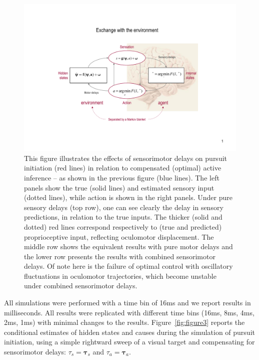 \documentclass[a4paper]{article} %
\begin{document}
\begin{figure}%
 \centerline{%
 \includegraphics[width=.95\columnwidth, clip, trim = 7.cm .5cm 6.1cm .4cm, page=4]{Figures_slides.pdf} %
}%
\caption{This figure illustrates the effects of sensorimotor
delays on pursuit initiation (red lines) in relation to compensated
(optimal) active inference -- as shown in the previous figure (blue
lines). The left panels show the true (solid lines) and estimated
sensory input (dotted lines), while action is shown in the right panels.
Under pure sensory delays (top row), one can see clearly the delay in
sensory predictions, in relation to the true inputs. The thicker (solid
and dotted) red lines correspond respectively to (true and predicted)
proprioceptive input, reflecting oculomotor displacement. The middle row
shows the equivalent results with pure motor delays and the lower row
presents the results with combined sensorimotor delays. Of note here is
the failure of optimal control with oscillatory fluctuations in
oculomotor trajectories, which become unstable under combined
sensorimotor delays.}%
\label{fig:figure4}
\end{figure}
All simulations were performed with a time bin of 16ms and we report results in milliseconds. All results were replicated with different time bins (16ms, 8ms, 4ms, 2ms, 1ms) with minimal changes to the results. %
Figure~\ref{fig:figure3} reports the conditional estimates of hidden states and causes
during the simulation of pursuit initiation, using a simple rightward
sweep of a visual target and compensating for sensorimotor delays:
$\tau_s = \bm{\tau}_s $ and
$\tau_a = \bm{\tau}_a$.
\end{document}

